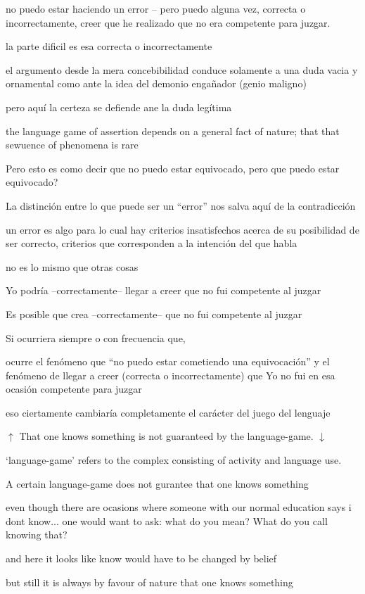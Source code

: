   no puedo estar haciendo un error -- pero puedo alguna vez, correcta o incorrectamente, creer que he realizado que no era competente para juzgar.

  la parte dificil es esa correcta o incorrectamente

  el argumento desde la mera concebibilidad conduce solamente a una duda vacia y ornamental como ante la idea del demonio engañador (genio maligno)

  pero aquí la certeza se defiende ane la duda legítima

the language game of assertion depends on a general fact of nature; that that sewuence of phenomena is rare

Pero esto es como decir que no puedo estar equivocado, pero que puedo estar equivocado?

La distinción entre lo que puede ser un ``error'' nos salva aquí de la contradicción

un error es algo para lo cual hay criterios insatisfechos acerca de su posibilidad de ser correcto, criterios que corresponden a la intención del que habla

no es lo mismo que otras cosas

Yo podría --correctamente-- llegar a creer que no fui competente al juzgar

Es posible que crea --correctamente-- que no fui competente al juzgar

Si ocurriera siempre o con frecuencia que,

ocurre el fenómeno
que ``no puedo estar cometiendo una equivocación''
y el fenómeno de
llegar a creer (correcta o incorrectamente) que Yo no fui en esa ocasión competente para juzgar

eso ciertamente cambiaría completamente el carácter del juego del lenguaje

$\uparrow$
That one knows something is not guaranteed by the language-game.
$\downarrow$

`language-game' refers to the complex consisting of activity and language use.

A certain language-game does not gurantee that one knows something

even though
there are ocasions where someone with our normal education says i dont know... one would want to ask: what do you mean? What do you call knowing that?

and here it looks like know would have to be changed by belief

  but still it is always by favour of nature that one knows something

